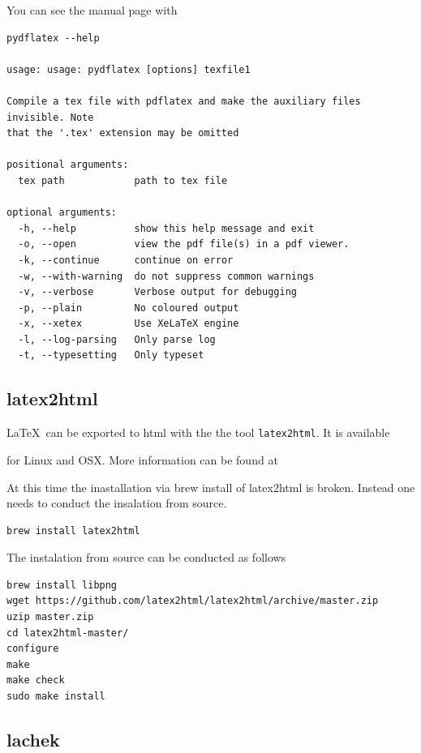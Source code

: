 You can see the manual page with 

\begin{verbatim}
pydflatex --help

usage: usage: pydflatex [options] texfile1

Compile a tex file with pdflatex and make the auxiliary files invisible. Note
that the '.tex' extension may be omitted

positional arguments:
  tex path            path to tex file

optional arguments:
  -h, --help          show this help message and exit
  -o, --open          view the pdf file(s) in a pdf viewer.
  -k, --continue      continue on error
  -w, --with-warning  do not suppress common warnings
  -v, --verbose       Verbose output for debugging
  -p, --plain         No coloured output
  -x, --xetex         Use XeLaTeX engine
  -l, --log-parsing   Only parse log
  -t, --typesetting   Only typeset
\end{verbatim}

\subsection{latex2html}

\LaTeX~can be exported to html with the the tool
\verb|latex2html|. It is available 

for Linux and OSX. More information can be found at



\begin{WARNING}
At this time the inastallation via brew install of latex2html is
broken. Instead one needs to conduct the insalation from source.

\begin{verbatim}
brew install latex2html
\end{verbatim}
\end{WARNING} 

The instalation from source can be conducted as follows

\begin{verbatim}
brew install libpng
wget https://github.com/latex2html/latex2html/archive/master.zip
uzip master.zip 
cd latex2html-master/
configure
make
make check
sudo make install
\end{verbatim}

\subsection{lachek}
\label{s:lacheck}

